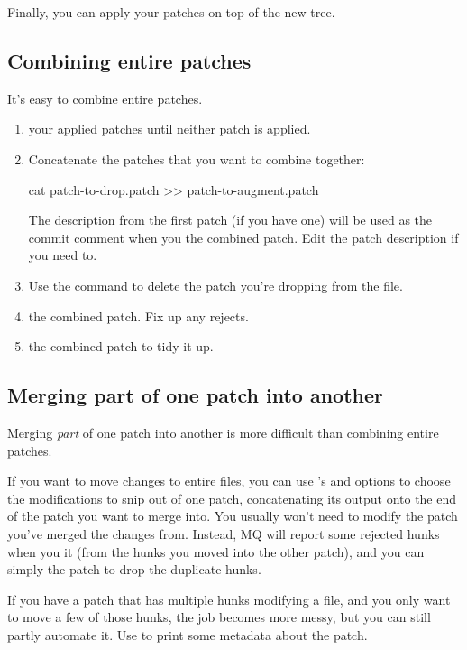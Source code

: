 Finally, you can apply your patches on top of the new tree.

\subsection{Combining entire patches}
\label{sec:mq:combine}

It's easy to combine entire patches.

\begin{enumerate}
\item {} your applied patches until neither patch is
  applied.
\item Concatenate the patches that you want to combine together:
  \begin{codesample4}
    cat patch-to-drop.patch >> patch-to-augment.patch
  \end{codesample4}
  The description from the first patch (if you have one) will be used
  as the commit comment when you  the combined patch.
  Edit the patch description if you need to.
\item Use the  command to delete the patch you're dropping
  from the  file.
\item {} the combined patch.  Fix up any rejects.
\item {} the combined patch to tidy it up.
\end{enumerate}

\subsection{Merging part of one patch into another}

Merging \emph{part} of one patch into another is more difficult than
combining entire patches.

If you want to move changes to entire files, you can use
's  and
 options to choose the modifications to snip
out of one patch, concatenating its output onto the end of the patch
you want to merge into.  You usually won't need to modify the patch
you've merged the changes from.  Instead, MQ will report some rejected
hunks when you  it (from the hunks you moved into the
other patch), and you can simply  the patch to drop
the duplicate hunks.

If you have a patch that has multiple hunks modifying a file, and you
only want to move a few of those hunks, the job becomes more messy,
but you can still partly automate it.  Use  to
print some metadata about the patch.

